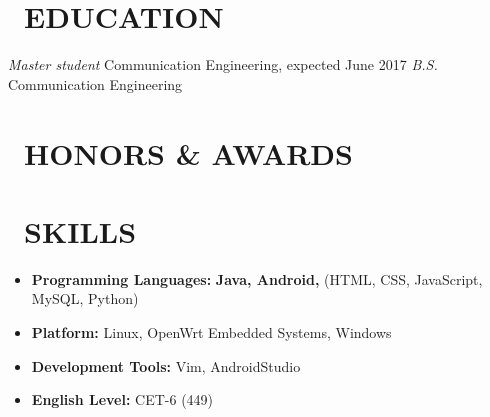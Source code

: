 \documentclass{resume}
\begin{document}


 
\section{\faGraduationCap\ EDUCATION}
\textit{Master student} Communication Engineering, expected June 2017
\textit{B.S.} Communication Engineering

\section{\faTrophy\ HONORS \& AWARDS}
\begin{onehalfspacing}
\end{onehalfspacing}


\section{\faCogs\ SKILLS}
\begin{itemize}[parsep=0.5ex]
  \item \textbf{Programming Languages:} \textbf{Java, Android,} (HTML, CSS, JavaScript, MySQL, Python) 
  \item \textbf{Platform:} Linux, OpenWrt Embedded Systems, Windows
  \item \textbf{Development Tools:} Vim, AndroidStudio
  \item \textbf{English Level:} CET-6 (449)
\end{itemize}
\end{document}
